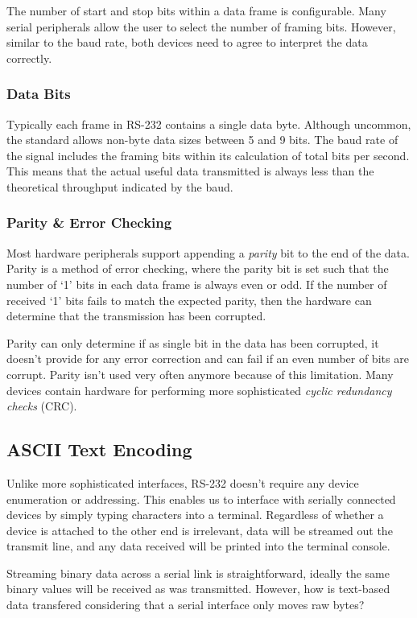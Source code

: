 \documentclass[11pt,fleqn]{book} %
\begin{document}
The number of start and stop bits within a data frame is configurable. Many serial peripherals allow the user to select the number of framing bits. However, similar to the baud rate, both devices need to agree to interpret the data correctly. 

\subsubsection{Data Bits} 
Typically each frame in RS-232 contains a single data byte. Although uncommon, the standard allows non-byte data sizes between 5 and 9 bits. The baud rate of the signal includes the framing bits within its calculation of total bits per second. This means that the actual useful data transmitted is always less than the theoretical throughput indicated by the baud. 

\subsubsection{Parity \& Error Checking}
Most hardware peripherals support appending a \textit{parity} bit to the end of the data. Parity is a method of error checking, where the parity bit is set such that the number of `1' bits in each data frame is always even or odd. If the number of received `1' bits fails to match the expected parity, then the hardware can determine that the transmission has been corrupted. 

Parity can only determine if as single bit in the data has been corrupted, it doesn't provide for any error correction and can fail if an even number of bits are corrupt. Parity isn't used very often anymore because of this limitation. Many devices contain hardware for performing more sophisticated \textit{cyclic redundancy checks} (CRC).  

\subsection{ASCII Text Encoding}

Unlike more sophisticated interfaces, RS-232 doesn't require any device enumeration or addressing. This enables us to interface with serially connected devices by simply typing characters into a terminal. Regardless of whether a device is attached to the other end is irrelevant, data will be streamed out the transmit line, and any data received will be printed into the terminal console.  

Streaming binary data across a serial link is straightforward, ideally the same binary values will be received as was transmitted. However, how is text-based data transfered considering that a serial interface only moves raw bytes? 
\end{document}
